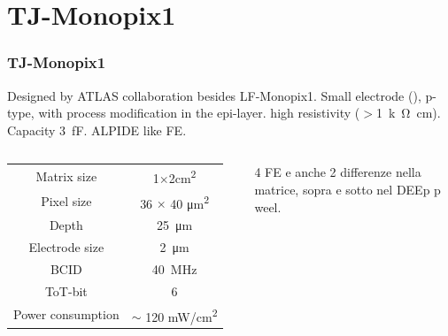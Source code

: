 \section{TJ-Monopix1}
    \begin{frame}
        \frametitle{TJ-Monopix1}
        Designed by ATLAS collaboration besides LF-Monopix1. 
        Small electrode (), p-type, with process modification in the epi-layer. high resistivity ($>$\SI{1}{k\ohm cm}). Capacity \SI{3}{fF}. ALPIDE like FE.

        \begin{columns}
                \begin{table}
                    \tiny
                    \begin{tabular}{| c |c |}
                    \hline
                    Matrix size &  1$\times$2\si{cm\squared}\\
                    Pixel size & 36 $\times$ 40 \si{\um\squared}\\
                    Depth & \SI{25}{\um}\\
                    Electrode size & \SI{2}{\um}\\
                    BCID & \SI{40}{MHz} \\
                    ToT-bit & 6 \\
                    Power consumption & $\sim$ 120 \si{mW/cm\squared}\\    
                    \hline
                    \end{tabular}
                \end{table}
            4 FE e anche 2 differenze nella matrice, sopra e sotto nel DEEp p weel.


        \end{columns}
    \end{frame} 

